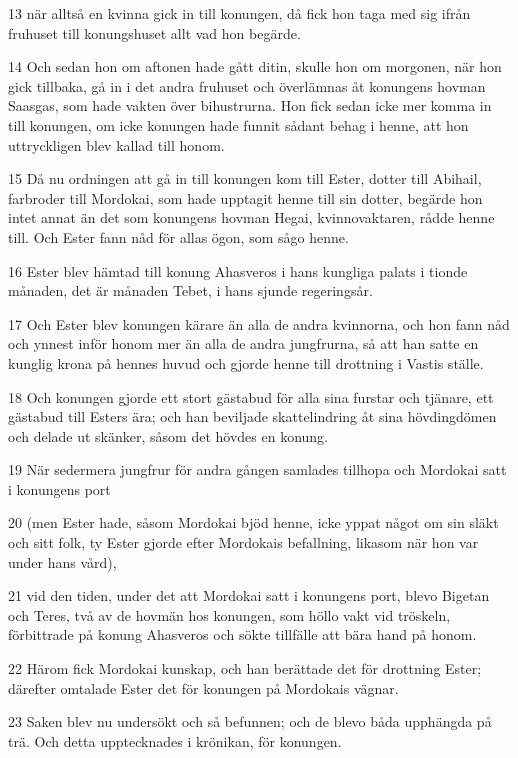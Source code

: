 \par 13 när alltså en kvinna gick in till konungen, då fick hon taga med sig ifrån fruhuset till konungshuset allt vad hon begärde.
\par 14 Och sedan hon om aftonen hade gått ditin, skulle hon om morgonen, när hon gick tillbaka, gå in i det andra fruhuset och överlämnas åt konungens hovman Saasgas, som hade vakten över bihustrurna. Hon fick sedan icke mer komma in till konungen, om icke konungen hade funnit sådant behag i henne, att hon uttryckligen blev kallad till honom.
\par 15 Då nu ordningen att gå in till konungen kom till Ester, dotter till Abihail, farbroder till Mordokai, som hade upptagit henne till sin dotter, begärde hon intet annat än det som konungens hovman Hegai, kvinnovaktaren, rådde henne till. Och Ester fann nåd för allas ögon, som sågo henne.
\par 16 Ester blev hämtad till konung Ahasveros i hans kungliga palats i tionde månaden, det är månaden Tebet, i hans sjunde regeringsår.
\par 17 Och Ester blev konungen kärare än alla de andra kvinnorna, och hon fann nåd och ynnest inför honom mer än alla de andra jungfrurna, så att han satte en kunglig krona på hennes huvud och gjorde henne till drottning i Vastis ställe.
\par 18 Och konungen gjorde ett stort gästabud för alla sina furstar och tjänare, ett gästabud till Esters ära; och han beviljade skattelindring åt sina hövdingdömen och delade ut skänker, såsom det hövdes en konung.
\par 19 När sedermera jungfrur för andra gången samlades tillhopa och Mordokai satt i konungens port
\par 20 (men Ester hade, såsom Mordokai bjöd henne, icke yppat något om sin släkt och sitt folk, ty Ester gjorde efter Mordokais befallning, likasom när hon var under hans vård),
\par 21 vid den tiden, under det att Mordokai satt i konungens port, blevo Bigetan och Teres, två av de hovmän hos konungen, som höllo vakt vid tröskeln, förbittrade på konung Ahasveros och sökte tillfälle att bära hand på honom.
\par 22 Härom fick Mordokai kunskap, och han berättade det för drottning Ester; därefter omtalade Ester det för konungen på Mordokais vägnar.
\par 23 Saken blev nu undersökt och så befunnen; och de blevo båda upphängda på trä. Och detta upptecknades i krönikan, för konungen.

